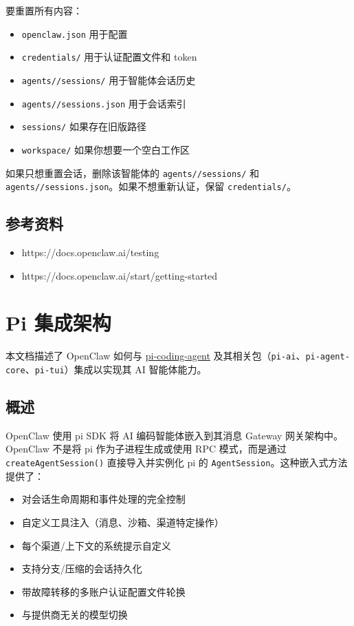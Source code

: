 要重置所有内容：

\begin{itemize}
  \item \texttt{openclaw.json} 用于配置
  \item \texttt{credentials/} 用于认证配置文件和 token
  \item \texttt{agents//sessions/} 用于智能体会话历史
  \item \texttt{agents//sessions.json} 用于会话索引
  \item \texttt{sessions/} 如果存在旧版路径
  \item \texttt{workspace/} 如果你想要一个空白工作区
\end{itemize}


如果只想重置会话，删除该智能体的 \texttt{agents//sessions/} 和 \texttt{agents//sessions.json}。如果不想重新认证，保留 \texttt{credentials/}。

\subsection{参考资料}


\begin{itemize}
  \item https://docs.openclaw.ai/testing
  \item https://docs.openclaw.ai/start/getting-started
\end{itemize}



\clearpage

\section{Pi 集成架构}


本文档描述了 OpenClaw 如何与 \href{https://github.com/badlogic/pi-mono/tree/main/packages/coding-agent}{pi-coding-agent} 及其相关包（\texttt{pi-ai}、\texttt{pi-agent-core}、\texttt{pi-tui}）集成以实现其 AI 智能体能力。

\subsection{概述}


OpenClaw 使用 pi SDK 将 AI 编码智能体嵌入到其消息 Gateway 网关架构中。OpenClaw 不是将 pi 作为子进程生成或使用 RPC 模式，而是通过 \texttt{createAgentSession()} 直接导入并实例化 pi 的 \texttt{AgentSession}。这种嵌入式方法提供了：

\begin{itemize}
  \item 对会话生命周期和事件处理的完全控制
  \item 自定义工具注入（消息、沙箱、渠道特定操作）
  \item 每个渠道/上下文的系统提示自定义
  \item 支持分支/压缩的会话持久化
  \item 带故障转移的多账户认证配置文件轮换
  \item 与提供商无关的模型切换
\end{itemize}


